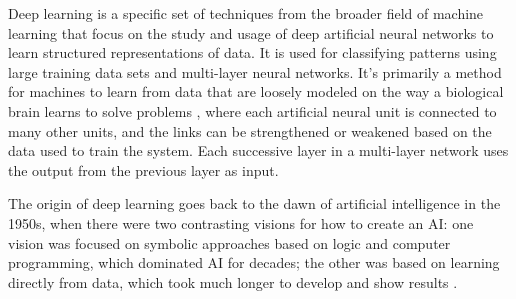Deep learning \cite{Polson2018} is a specific set of techniques from the broader field of machine learning that focus on the study and usage of deep artificial neural networks to learn structured representations of data. It is used for classifying patterns using large training data sets and multi-layer neural networks. It's primarily a method for machines to learn from data that are loosely modeled on the way a biological brain learns to solve problems \cite{pavlus_john}, where each artificial neural unit is connected to many other units, and the links can be strengthened or weakened based on the data used to train the system. Each successive layer in a multi-layer network uses the output from the previous layer as input.

The origin of deep learning goes back to the dawn of artificial intelligence in the 1950s, when there were two contrasting visions for how to create an AI: one vision was focused on symbolic approaches based on logic and computer programming, which dominated AI for decades; the other was based on learning directly from data, which took much longer to develop and show results \cite{sejnowski2018deep}.

